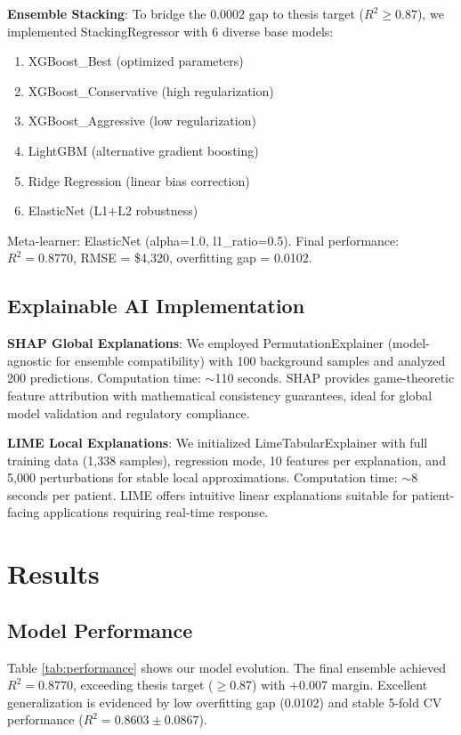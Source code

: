 \documentclass[conference]{IEEEtran}
\begin{document}
\textbf{Ensemble Stacking}: To bridge the 0.0002 gap to thesis target ($R^2 \geq 0.87$), we implemented StackingRegressor with 6 diverse base models:
\begin{enumerate}
\item XGBoost\_Best (optimized parameters)
\item XGBoost\_Conservative (high regularization)
\item XGBoost\_Aggressive (low regularization)
\item LightGBM (alternative gradient boosting)
\item Ridge Regression (linear bias correction)
\item ElasticNet (L1+L2 robustness)
\end{enumerate}

Meta-learner: ElasticNet (alpha=1.0, l1\_ratio=0.5). Final performance: $R^2 = 0.8770$, RMSE = \$4,320, overfitting gap = 0.0102.

\subsection{Explainable AI Implementation}

\textbf{SHAP Global Explanations}: We employed PermutationExplainer (model-agnostic for ensemble compatibility) with 100 background samples and analyzed 200 predictions. Computation time: $\sim$110 seconds. SHAP provides game-theoretic feature attribution with mathematical consistency guarantees, ideal for global model validation and regulatory compliance.

\textbf{LIME Local Explanations}: We initialized LimeTabularExplainer with full training data (1,338 samples), regression mode, 10 features per explanation, and 5,000 perturbations for stable local approximations. Computation time: $\sim$8 seconds per patient. LIME offers intuitive linear explanations suitable for patient-facing applications requiring real-time response.

\section{Results}

\subsection{Model Performance}
Table \ref{tab:performance} shows our model evolution. The final ensemble achieved $R^2 = 0.8770$, exceeding thesis target ($\geq$0.87) with +0.007 margin. Excellent generalization is evidenced by low overfitting gap (0.0102) and stable 5-fold CV performance ($R^2 = 0.8603 \pm 0.0867$).
\end{document}
